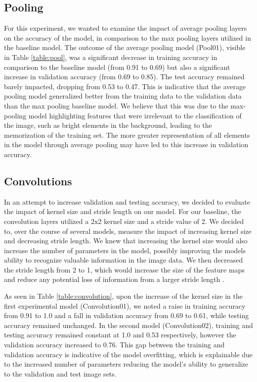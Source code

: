\documentclass{article}
\begin{document}
\subsection{Pooling}

For this experiment, we wanted to examine the impact of average pooling layers on the accuracy of the model, in comparison to the max pooling layers utilized in the baseline model. The outcome of the average pooling model (Pool01), visible in Table \ref{table:pool}, was a significant decrease in training accuracy in comparison to the baseline model (from 0.91 to 0.69) but also a significant increase in validation accuracy (from 0.69 to 0.85). The test accuracy remained barely impacted, dropping from 0.53 to 0.47. This is indicative that the average pooling model generalized better from the training data to the validation data than the max pooling baseline model. We believe that this was due to the max-pooling model highlighting features that were irrelevant to the classification of the image, such as bright elements in the background, leading to the memorization of the training set. The more greater representation of all elements in the model through average pooling may have led to this increase in validation accuracy.

\subsection{Convolutions}

In an attempt to increase validation and testing accuracy, we decided to evaluate the impact of kernel size and stride length on our model. For our baseline, the convolution layers utilized a 2x2 kernel size and a stride value of 2. We decided to, over the course of several models, measure the impact of increasing kernel size and decreasing stride length. We knew that increasing the kernel size would also increase the number of parameters in the model, possibly improving the models ability to recognize valuable information in the image data. We then decreased the stride length from 2 to 1, which would increase the size of the feature maps and reduce any potential loss of information from a larger stride length \cite{Goodfellow-et-al-2016}.

As seen in Table \ref{table:convolution}, upon the increase of the kernel size in the first experimental model (Convolution01), we noted a raise in training accuracy from 0.91 to 1.0 and a fall in validation accuracy from 0.69 to 0.61, while testing accuracy remained unchanged. In the second model (Convolution02), training and testing accuracy remained constant at 1.0 and 0.53 respectively, however the validation accuracy increased to 0.76. This gap between the training and validation accuracy is indicative of the model overfitting, which is explainable due to the increased number of parameters reducing the model's ability to generalize to the validation and test image sets.
\end{document}
